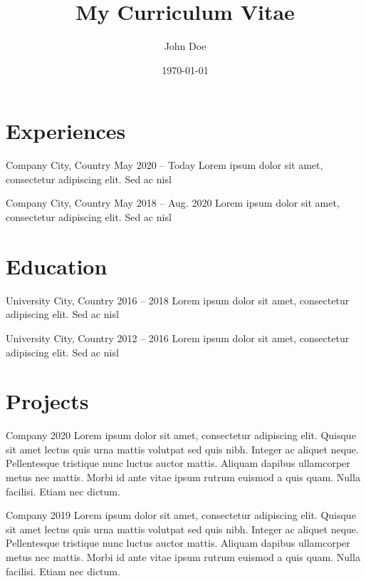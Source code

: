 \documentclass[english]{currivitae-classic}
\title{My Curriculum Vitae}
\author{John Doe}
\date{\today}
\begin{document}

\section{Experiences}
           {Company}
           {City, Country}
           {May 2020 -- Today}
           {
            Lorem ipsum dolor sit amet, consectetur adipiscing elit. Sed ac nisl
           }

           {Company}
           {City, Country}
           {May 2018 -- Aug. 2020}
           {
            Lorem ipsum dolor sit amet, consectetur adipiscing elit. Sed ac nisl
           }

\section{Education}
           {University}
           {City, Country}
           {2016 -- 2018}
           {
            Lorem ipsum dolor sit amet, consectetur adipiscing elit. Sed ac nisl
           }

           {University}
           {City, Country}
           {2012 -- 2016}
           {
            Lorem ipsum dolor sit amet, consectetur adipiscing elit. Sed ac nisl
           }

\section{Projects}
           {Company}
           {}
           {2020}
           {
            Lorem ipsum dolor sit amet, consectetur adipiscing elit. Quisque sit amet lectus quis urna mattis volutpat sed quis nibh. Integer ac aliquet neque. Pellentesque tristique nunc luctus auctor mattis. Aliquam dapibus ullamcorper metus nec mattis. Morbi id ante vitae ipsum rutrum euismod a quis quam. Nulla facilisi. Etiam nec dictum.
           }

           {Company}
           {}
           {2019}
           {
            Lorem ipsum dolor sit amet, consectetur adipiscing elit. Quisque sit amet lectus quis urna mattis volutpat sed quis nibh. Integer ac aliquet neque. Pellentesque tristique nunc luctus auctor mattis. Aliquam dapibus ullamcorper metus nec mattis. Morbi id ante vitae ipsum rutrum euismod a quis quam. Nulla facilisi. Etiam nec dictum.
           }
\end{document}
